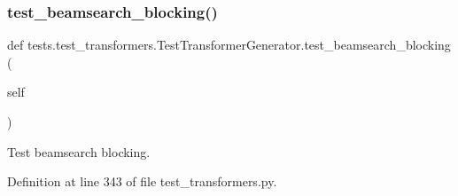 \subsubsection{\texorpdfstring{test\+\_\+beamsearch\+\_\+blocking()}{test\_beamsearch\_blocking()}}
{\footnotesize\ttfamily def tests.\+test\+\_\+transformers.\+Test\+Transformer\+Generator.\+test\+\_\+beamsearch\+\_\+blocking (\begin{DoxyParamCaption}\item[{}]{self }\end{DoxyParamCaption})}

\begin{DoxyVerb}Test beamsearch blocking.
\end{DoxyVerb}
 

Definition at line 343 of file test\+\_\+transformers.\+py.


